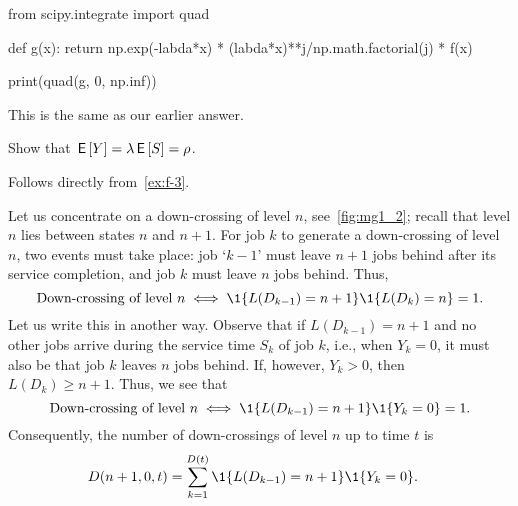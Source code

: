\begin{exercise}
\begin{solution}
\begin{pyconsole}
from scipy.integrate import quad

def g(x):
 return np.exp(-labda*x) * (labda*x)**j/np.math.factorial(j) * f(x)

print(quad(g, 0, np.inf))
\end{pyconsole}

This is the same as our earlier answer.
\end{solution}
\end{exercise}

\begin{exercise}
Show that $\,\mathsf{E}\left[Y\right] = \lambda \,\mathsf{E}\left[S\right] = \rho$.
\begin{solution}
Follows directly from~\cref{ex:f-3}. 
\end{solution}
\end{exercise}

Let us concentrate on a down-crossing of level $n$, see~\cref{fig:mg1_2}; recall that level $n$ lies between states $n$ and $n+1$.
For job $k$ to generate a down-crossing of level $n$, two events must take place: job `$k-1$' must leave $n+1$ jobs behind after its service completion, and job $k$ must leave $n$ jobs behind.
Thus,
 \begin{equation*}
 \text{Down-crossing of level $n$} \iff \1{L(D_{k-1}) = n+1}\1{L(D_k)=n} = 1.
 \end{equation*}
Let us write this in another
way. Observe that if $L(D_{k-1})=n+1$ and no other jobs arrive during
the service time $S_k$ of job $k$, i.e., when $Y_k=0$, it must also be
that job $k$ leaves $n$ jobs behind. If, however, $Y_k>0$, then
$L(D_k)\geq n+1$. Thus, we see that
 \begin{equation*}
 \text{Down-crossing of level $n$} \iff \1{L(D_{k-1}) = n+1}\1{Y_k=0} = 1.
 \end{equation*}
Consequently, the number of down-crossings of level $n$ up to time $t$ is
\begin{equation*}
 \begin{split}
 D(n+1, 0, t) 
&= \sum_{k=1}^{D(t)}\1{L(D_{k-1})=n+1}\1{Y_k=0}.
 \end{split}
\end{equation*}


